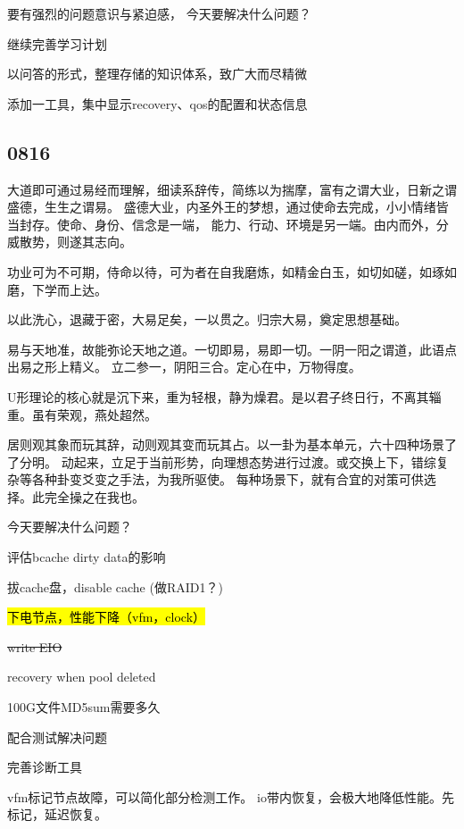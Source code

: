 要有强烈的问题意识与紧迫感，
今天要解决什么问题？
\begin{enumbox}
\item 继续完善学习计划
\item 以问答的形式，整理存储的知识体系，致广大而尽精微
\item 添加一工具，集中显示recovery、qos的配置和状态信息
\end{enumbox}

\subsection{0816}

大道即可通过易经而理解，细读系辞传，简练以为揣摩，富有之谓大业，日新之谓盛德，生生之谓易。
盛德大业，内圣外王的梦想，通过使命去完成，小小情绪皆当封存。使命、身份、信念是一端，
能力、行动、环境是另一端。由内而外，分威散势，则遂其志向。

功业可为不可期，侍命以待，可为者在自我磨炼，如精金白玉，如切如磋，如琢如磨，下学而上达。

以此洗心，退藏于密，大易足矣，一以贯之。归宗大易，奠定思想基础。

易与天地准，故能弥论天地之道。一切即易，易即一切。一阴一阳之谓道，此语点出易之形上精义。
立二参一，阴阳三合。定心在中，万物得度。

U形理论的核心就是沉下来，重为轻根，静为燥君。是以君子终日行，不离其辎重。虽有荣观，燕处超然。

居则观其象而玩其辞，动则观其变而玩其占。以一卦为基本单元，六十四种场景了了分明。
动起来，立足于当前形势，向理想态势进行过渡。或交换上下，错综复杂等各种卦变爻变之手法，为我所驱使。
每种场景下，就有合宜的对策可供选择。此完全操之在我也。

今天要解决什么问题？
\begin{enumbox}
\item 评估bcache dirty data的影响
\item 拔cache盘，disable cache (做RAID1？)
\item \hl{下电节点，性能下降（vfm，clock）}
\item \sout{write EIO}
\item recovery when pool deleted
\item 100G文件MD5sum需要多久
\item 配合测试解决问题
\item 完善诊断工具
\end{enumbox}

vfm标记节点故障，可以简化部分检测工作。
io带内恢复，会极大地降低性能。先标记，延迟恢复。

